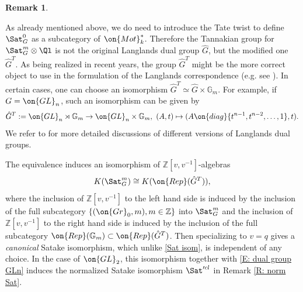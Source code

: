 \documentclass[11pt]{amsart}
\theoremstyle{definition}
\theoremstyle{definition}
\newtheorem{rmk}[thm]{Remark}
\theoremstyle{definition}
\numberwithin{equation}{subsection}
\newcommand{\bG}{{\mathbb G}}
\newcommand{\bZ}{{\mathbb Z}}
\newcommand{\Gr}{{\on{Gr}}}
\newcommand{\GL}{{\on{GL}}}
\begin{document}
\begin{rmk}
\label{R:Tate twist}

As already mentioned above, we do need to introduce the Tate twist to define $\Sat_G^0$ as a subcategory of $\on{Mot}^*_k$. Therefore the Tannakian group for $\Sat_G^m\otimes\Ql$ is not the original Langlands dual group $\hat{G}$, but the modified one $\hat G^T$. As being realized in recent years, the group $\hat G^T$ might be the more correct object to use in the formulation of the Langlands correspondence (e.g. see \cite{BG}). In certain cases, one can choose an isomorphism $\hat{G}^T\simeq \hat{G}\times \bG_m$. For example, if $G=\GL_n$, such an isomorphism can be given by 
\begin{equation}
\label{E: dual group GLn}
\hat{G}^T:=\GL_n\rtimes\bG_m\to \GL_n\times \bG_m,\ (A,t)\mapsto (A\on{diag}\{t^{n-1},t^{n-2},\ldots,1\}, t).
\end{equation}
We refer to \cite[\S 5.5]{Zh2} for more detailed discussions of different versions of Langlands dual groups. 

The equivalence induces an isomorphism of $\bZ[v,v^{-1}]$-algebras 
$$K(\Sat^m_G)\cong K(\on{Rep}(\hat{G}^T)),$$ 
where the inclusion of $\bZ[v,v^{-1}]$ to the left hand side is induced by the inclusion of the full subcategory $\{(\Gr_0,m), m\in\bZ\}$ into $\Sat_G^m$ and the inclusion of $\bZ[v,v^{-1}]$ to the right hand side is induced by the inclusion of the full subcategory $\on{Rep}(\bG_m)\subset \on{Rep}(\hat G^T)$. Then specializing to $v=q$ gives a \emph{canonical} Satake isomorphism, which unlike \eqref{Sat isom}, is independent of any choice. In the case of $\GL_2$, this isomorphism together with \eqref{E: dual group GLn} induces the normalized Satake isomorphism $\Sat'^{cl}$ in Remark \ref{R: norm Sat}.
\end{rmk}
\end{document}
